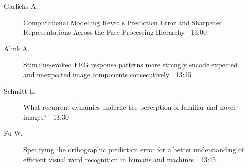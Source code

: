 \begin{symposium}
\begin{description}
                \item [ Garlichs A.] Computational Modelling Reveals Prediction Error and Sharpened Representations Across the Face-Processing Hierarchy \textcolor{mygray}{ | 13:00}    
                
                \item [ Alink A.] Stimulus-evoked EEG response patterns more strongly encode expected and unexpected image components consecutively \textcolor{mygray}{ | 13:15}    
                
                \item [ Schmitt L.] What recurrent dynamics underlie the perception of familiar and novel images? \textcolor{mygray}{ | 13:30}    
                
                \item [ Fu W.] Specifying the orthographic prediction error for a better understanding of efficient visual word recognition in humans and machines \textcolor{mygray}{ | 13:45}    
                
            \end{description} 
            \end{symposium}
            
